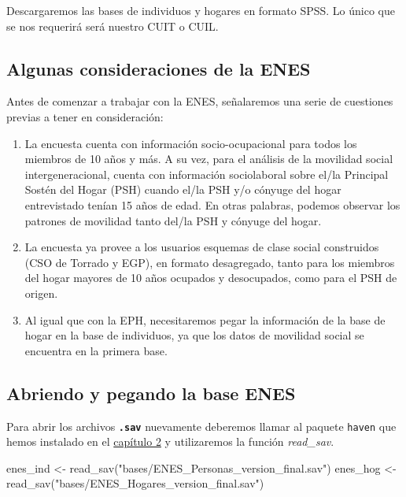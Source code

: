 \documentclass[
]{book}
\newenvironment{Shaded}{\begin{snugshade}}{\end{snugshade}}
\newcommand{\FunctionTok}[1]{\textcolor[rgb]{0.00,0.00,0.00}{#1}}
\newcommand{\NormalTok}[1]{#1}
\newcommand{\OtherTok}[1]{\textcolor[rgb]{0.56,0.35,0.01}{#1}}
\newcommand{\StringTok}[1]{\textcolor[rgb]{0.31,0.60,0.02}{#1}}
\begin{document}
Descargaremos las bases de individuos y hogares en formato SPSS. Lo único que se nos requerirá será nuestro CUIT o CUIL.

\hypertarget{algunas-consideraciones-de-la-enes}{%
\subsection{Algunas consideraciones de la ENES}\label{algunas-consideraciones-de-la-enes}}

Antes de comenzar a trabajar con la ENES, señalaremos una serie de cuestiones previas a tener en consideración:

\begin{enumerate}
\def\labelenumi{\arabic{enumi}.}
\item
  La encuesta cuenta con información socio-ocupacional para todos los miembros de 10 años y más. A su vez, para el análisis de la movilidad social intergeneracional, cuenta con información sociolaboral sobre el/la Principal Sostén del Hogar (PSH) cuando el/la PSH y/o cónyuge del hogar entrevistado tenían 15 años de edad. En otras palabras, podemos observar los patrones de movilidad tanto del/la PSH y cónyuge del hogar.
\item
  La encuesta ya provee a los usuarios esquemas de clase social construidos (CSO de Torrado y EGP), en formato desagregado, tanto para los miembros del hogar mayores de 10 años ocupados y desocupados, como para el PSH de origen.
\item
  Al igual que con la EPH, necesitaremos pegar la información de la base de hogar en la base de individuos, ya que los datos de movilidad social se encuentra en la primera base.
\end{enumerate}

\hypertarget{abriendo-y-pegando-la-base-enes}{%
\subsection{Abriendo y pegando la base ENES}\label{abriendo-y-pegando-la-base-enes}}

Para abrir los archivos \textbf{\texttt{.sav}} nuevamente deberemos llamar al paquete \texttt{haven} que hemos instalado en el \protect\hyperlink{eph2}{capítulo 2} y utilizaremos la función \emph{read\_sav}.

\begin{Shaded}
\begin{Highlighting}[]
\NormalTok{enes\_ind }\OtherTok{\textless{}{-}} \FunctionTok{read\_sav}\NormalTok{(}\StringTok{"bases/ENES\_Personas\_version\_final.sav"}\NormalTok{)}
\NormalTok{enes\_hog }\OtherTok{\textless{}{-}} \FunctionTok{read\_sav}\NormalTok{(}\StringTok{"bases/ENES\_Hogares\_version\_final.sav"}\NormalTok{)}
\end{Highlighting}
\end{Shaded}
\end{document}
